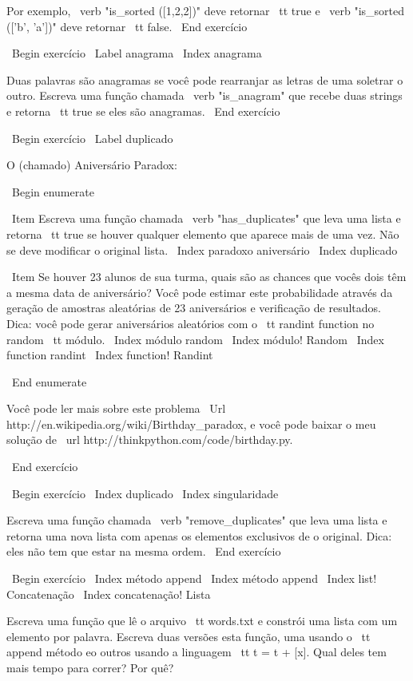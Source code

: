 \documentclass[10pt]{book}
\begin{document}
{{{{{{{Por exemplo, \ verb "is_sorted ([1,2,2])" deve retornar {\ tt true}
e \ verb "is_sorted (['b', 'a'])" deve retornar {\ tt false}.
\ End {} exercício


\ Begin {} exercício
\ Label {} anagrama
\ Index {} anagrama

Duas palavras são anagramas se você pode rearranjar as letras de uma
soletrar o outro. Escreva uma função chamada \ verb "is_anagram"
que recebe duas strings e retorna {\ tt true} se eles são anagramas.
\ End {} exercício


\ Begin {} exercício
\ Label {} duplicado

O (chamado) Aniversário Paradox:

\ Begin {enumerate}

\ Item Escreva uma função chamada \ verb "has_duplicates" que leva
uma lista e retorna {\ tt true} se houver qualquer elemento que
aparece mais de uma vez. Não se deve modificar o original
lista.
\ Index {paradoxo aniversário}
\ Index {} duplicado

\ Item Se houver 23 alunos de sua turma, quais são as chances
que vocês dois têm a mesma data de aniversário? Você pode estimar este
probabilidade através da geração de amostras aleatórias de 23 aniversários
e verificação de resultados. Dica: você pode gerar aniversários aleatórios
com o {\ tt randint} function no {random \ tt} módulo.
\ Index {módulo random}
\ Index {módulo! Random}
\ Index {function randint}
\ Index {function! Randint}

\ End {enumerate}

Você pode ler mais sobre este problema
\ Url {http://en.wikipedia.org/wiki/Birthday_paradox}, e você pode baixar o meu
solução de \ url {http://thinkpython.com/code/birthday.py}.

\ End {} exercício


\ Begin {} exercício
\ Index {} duplicado
\ Index {} singularidade

Escreva uma função chamada \ verb "remove_duplicates" que leva
uma lista e retorna uma nova lista com apenas os elementos exclusivos de
o original. Dica: eles não tem que estar na mesma ordem.
\ End {} exercício


\ Begin {} exercício
\ Index {método append}
\ Index {método append}
\ Index {list! Concatenação}
\ Index {concatenação! Lista}

Escreva uma função que lê o arquivo {\ tt words.txt} e constrói
uma lista com um elemento por palavra. Escreva duas versões
esta função, uma usando o {\ tt} append método eo
outros usando a linguagem {\ tt t = t + [x]}. Qual deles tem
mais tempo para correr? Por quê?

}}}}}}}
\end{document}
